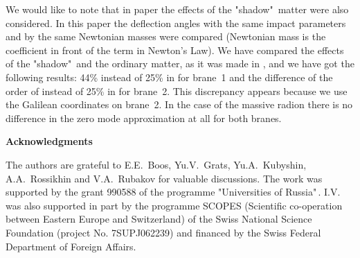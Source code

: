 \documentclass[a4paper,12pt]{article}
\begin{document}
We would like to note that in paper \cite{GarTan} the effects of
the "shadow"\ matter were also considered. In this paper the
deflection angles with the same impact parameters and by the same
Newtonian masses were compared (Newtonian mass is the coefficient
in front of the \coordHE{} term in Newton's Law). We have
compared the effects of the "shadow"\ and the ordinary matter, as
it was made in \cite{GarTan}, and we have got the following
results: 44\% instead of 25\% in \cite{GarTan} for brane~1 and the
difference of the order of \coordHE{} instead of 25\% in
\cite{GarTan} for brane~2. This discrepancy appears because we use
the  Galilean coordinates on brane~2. In the case of the massive
radion there is no difference in the zero mode approximation at
all for both branes.

\bigskip
{ \large \bf Acknowledgments}
\medskip

The authors are grateful to E.E.~Boos, Yu.V.~Grats, Yu.A.~Kubyshin,
A.A.~Rossikhin and V.A.~Rubakov for valuable discussions. The work  was
supported by the grant 990588 of the programme "Universities of Russia"\,.
I.V. was also supported in part by the programme SCOPES (Scientific
co-operation between Eastern Europe and Switzerland) of the Swiss National
Science Foundation (project No. 7SUPJ062239) and financed by the Swiss
Federal Department of Foreign Affairs.
\end{document}
